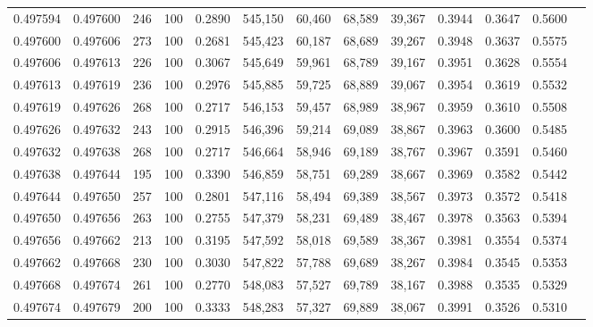 \begin{tabular}{rrrrrrrrrrrrr}
0.497594 & 0.497600 &   246 & 100 &                                     0.2890 & 545,150 &  60,460 &  68,589 &  39,367 & 0.3944 & 0.3647 & 0.5600 \\
0.497600 & 0.497606 &   273 & 100 &                                     0.2681 & 545,423 &  60,187 &  68,689 &  39,267 & 0.3948 & 0.3637 & 0.5575 \\
0.497606 & 0.497613 &   226 & 100 &                                     0.3067 & 545,649 &  59,961 &  68,789 &  39,167 & 0.3951 & 0.3628 & 0.5554 \\
0.497613 & 0.497619 &   236 & 100 &                                     0.2976 & 545,885 &  59,725 &  68,889 &  39,067 & 0.3954 & 0.3619 & 0.5532 \\
0.497619 & 0.497626 &   268 & 100 &                                     0.2717 & 546,153 &  59,457 &  68,989 &  38,967 & 0.3959 & 0.3610 & 0.5508 \\
0.497626 & 0.497632 &   243 & 100 &                                     0.2915 & 546,396 &  59,214 &  69,089 &  38,867 & 0.3963 & 0.3600 & 0.5485 \\
0.497632 & 0.497638 &   268 & 100 &                                     0.2717 & 546,664 &  58,946 &  69,189 &  38,767 & 0.3967 & 0.3591 & 0.5460 \\
0.497638 & 0.497644 &   195 & 100 &                                     0.3390 & 546,859 &  58,751 &  69,289 &  38,667 & 0.3969 & 0.3582 & 0.5442 \\
0.497644 & 0.497650 &   257 & 100 &                                     0.2801 & 547,116 &  58,494 &  69,389 &  38,567 & 0.3973 & 0.3572 & 0.5418 \\
0.497650 & 0.497656 &   263 & 100 &                                     0.2755 & 547,379 &  58,231 &  69,489 &  38,467 & 0.3978 & 0.3563 & 0.5394 \\
0.497656 & 0.497662 &   213 & 100 &                                     0.3195 & 547,592 &  58,018 &  69,589 &  38,367 & 0.3981 & 0.3554 & 0.5374 \\
0.497662 & 0.497668 &   230 & 100 &                                     0.3030 & 547,822 &  57,788 &  69,689 &  38,267 & 0.3984 & 0.3545 & 0.5353 \\
0.497668 & 0.497674 &   261 & 100 &                                     0.2770 & 548,083 &  57,527 &  69,789 &  38,167 & 0.3988 & 0.3535 & 0.5329 \\
0.497674 & 0.497679 &   200 & 100 &                                     0.3333 & 548,283 &  57,327 &  69,889 &  38,067 & 0.3991 & 0.3526 & 0.5310 \\

\end{tabular}
